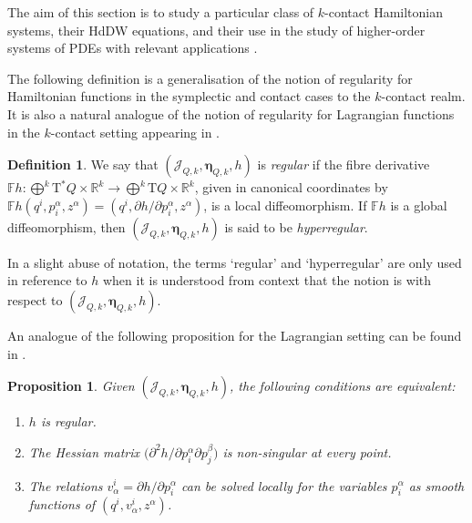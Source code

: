 \documentclass[11pt,twoside]{article}
\theoremstyle{plain}
\newtheorem{proposition}[theorem]{Proposition} \newtheorem{corollary}[theorem]{Corollary}
\theoremstyle{definition}
\newtheorem{definition}[theorem]{Definition}
\theoremstyle{remark}
\newcommand{\T}{\mathrm{T}}
\begin{document}
The aim of this section is to study a particular class of 
$k$-contact Hamiltonian systems, their HdDW equations, and their use in the study of higher-order systems of PDEs with relevant applications \cite{Riv_22}.

The following definition is a generalisation of the notion of regularity for Hamiltonian functions in the symplectic and contact cases to the $k$-contact realm. It is also a natural analogue of the notion of regularity for Lagrangian functions in the $k$-contact setting appearing in \cite{Riv_22}.

\begin{definition}\label{def:regular_hamiltonian}
We say that \((\mathcal{J}_{Q,k},\bm \eta_{Q,k},h)\) is \emph{regular} if the fibre derivative \(\mathbb Fh\colon\bigoplus^k\T^*Q\times\mathbb R^k\to \bigoplus^k\T Q\times\mathbb R^k\), given in canonical coordinates by \(\mathbb Fh(q^i,p_i^\alpha,z^\alpha)=(q^i,\partial h/\partial p_i^\alpha,z^\alpha)\), is a local diffeomorphism. If \(\mathbb Fh\) is a global diffeomorphism, then \((\mathcal{J}_{Q,k},\bm \eta_{Q,k},h)\) is said to be \emph{hyperregular}.
\end{definition}

In a slight abuse of notation, the terms `regular' and `hyperregular' are only used in reference to $h$ when it is understood from context that the notion is with respect to $(\mathcal{J}_{Q,k},\bm\eta_{Q,k},h)$. 

An analogue of the following proposition for the Lagrangian setting can be found in \cite[Proposition 3.2]{Riv_22}.

\begin{proposition}\label{prop:equivalent_regular_hamiltonian}
Given \((\mathcal{J}_{Q,k},\bm\eta_{Q,k}, h)\), the following conditions are equivalent: 
\begin{enumerate}
\item \(h\) is regular.
\item The Hessian matrix \(\bigl(\partial^2 h/\partial p_i^\alpha\partial p_j^\beta\bigr)\) is non-singular at every point.
\item The relations \(v_\alpha^i=\partial h/\partial p_i^\alpha\) can be solved locally for the variables \(p_i^\alpha\) as smooth functions of \((q^i,v_\alpha^i,z^\alpha)\).
\end{enumerate}
\end{proposition}
\end{document}
